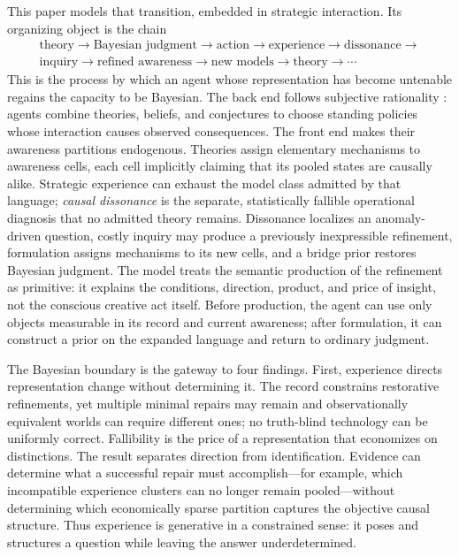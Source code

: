 \documentclass[11pt]{article}
\theoremstyle{definition}
\begin{document}
This paper models that transition, embedded in strategic interaction.
Its organizing object is the chain
\begin{align*}
	\text{theory}
	\longrightarrow
	\text{Bayesian judgment}
	\longrightarrow
	\text{action}
	\longrightarrow
	\text{experience}
	\longrightarrow
	\text{dissonance}
	\longrightarrow\\
	\text{inquiry}
	\longrightarrow
	\text{refined awareness}
	\longrightarrow
	\text{new models}
	\longrightarrow
	\text{theory}
	\longrightarrow \cdots
\end{align*}
This is the process by which an agent whose representation has become untenable regains the capacity to be Bayesian.
The back end follows subjective rationality \citep{KalaiLehrer1993b,Ryall2003}: agents combine theories, beliefs, and conjectures to choose standing policies whose interaction causes observed consequences.
The front end makes their awareness partitions endogenous.
Theories assign elementary mechanisms to awareness cells, each cell implicitly claiming that its pooled states are causally alike.
Strategic experience can exhaust the model class admitted by that language; \emph{causal dissonance} is the separate, statistically fallible operational diagnosis that no admitted theory remains.
Dissonance localizes an anomaly-driven question, costly inquiry may produce a previously inexpressible refinement, formulation assigns mechanisms to its new cells, and a bridge prior restores Bayesian judgment.
The model treats the semantic production of the refinement as primitive: it explains the conditions, direction, product, and price of insight, not the conscious creative act itself.
Before production, the agent can use only objects measurable in its record and current awareness; after formulation, it can construct a prior on the expanded language and return to ordinary judgment.

The Bayesian boundary is the gateway to four findings.
First, experience directs representation change without determining it.
The record constrains restorative refinements, yet multiple minimal repairs may remain and observationally equivalent worlds can require different ones; no truth-blind technology can be uniformly correct.
Fallibility is the price of a representation that economizes on distinctions.
The result separates direction from identification.
Evidence can determine what a successful repair must accomplish---for example, which incompatible experience clusters can no longer remain pooled---without determining which economically sparse partition captures the objective causal structure.
Thus experience is generative in a constrained sense: it poses and structures a question while leaving the answer underdetermined.
\end{document}
